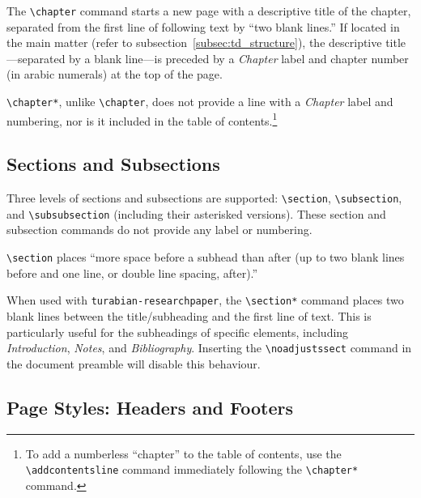 \documentclass{article}
\newcommand{\textcmd}[1]{\texttt{\textbackslash #1}}
\begin{document}
The \textcmd{chapter} command starts a new page with a descriptive title of the chapter, separated from the first line of following text by ``two blank lines.'' If located in the main matter (refer to subsection~\ref{subsec:td_structure}), the descriptive title---separated by a blank line---is preceded by a \emph{Chapter} label and chapter number (in arabic numerals) at the top of the page.\autocite[402]{turabian_manual_2018}

\textcmd{chapter*}, unlike \textcmd{chapter}, does not provide a line with a \emph{Chapter} label and numbering, nor is it included in the table of contents.\footnote{%
	To add a numberless ``chapter'' to the table of contents, use the \textcmd{addcontentsline} command immediately following the \textcmd{chapter*} command.}


\clearpage
\subsection{Sections and Subsections}

Three levels of sections and subsections are supported: \textcmd{section}, \textcmd{subsection}, and \textcmd{subsubsection} (including their asterisked versions). These section and subsection commands do not provide any label or numbering.

\textcmd{section} places ``more space before a subhead than after (up to two blank lines before and one line, or double line spacing, after).''\autocite[404]{turabian_manual_2018}

When used with \texttt{turabian-researchpaper}, the \textcmd{section*} command places two blank lines between the title/subheading and the first line of text. This is particularly useful for the subheadings of specific elements, including \emph{Introduction}, \emph{Notes}, and \emph{Bibliography}.\autocite[400--411]{turabian_manual_2018} Inserting the \textcmd{noadjustssect} command in the document preamble will disable this behaviour.


\subsection{Page Styles: Headers and Footers}
\label{subsec:page_styles}
\end{document}
